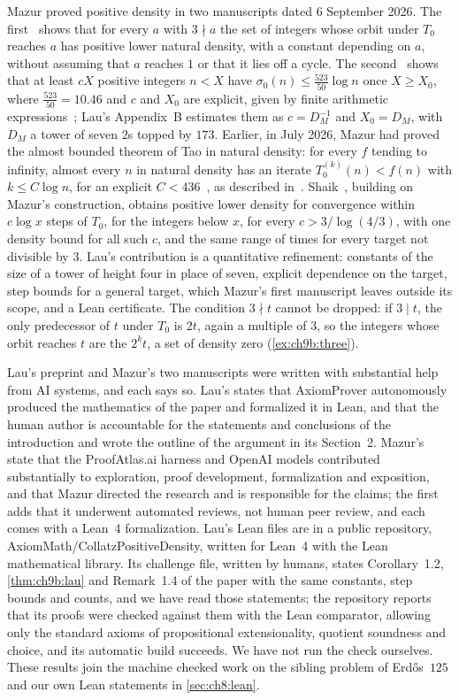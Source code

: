 Mazur proved positive density in two manuscripts dated 6 September 2026. The first~\cite[Theorem~1.1]{mazur2026pred} shows that for every $a$ with $3\nmid a$ the set of integers whose orbit under $T_0$ reaches $a$ has positive lower natural density, with a constant depending on $a$, without assuming that $a$ reaches $1$ or that it lies off a cycle. The second~\cite[Theorem~1.1]{mazur2026time} shows that at least $cX$ positive integers $n<X$ have $\sigma_0(n)\le\frac{523}{50}\log n$ once $X\ge X_0$, where $\frac{523}{50}=10.46$ and $c$ and $X_0$ are explicit, given by finite arithmetic expressions~\cite[eq.~(8.6)]{mazur2026time}; Lau's Appendix~B estimates them as $c=D_M^{-1}$ and $X_0=D_M$, with $D_M$ a tower of seven $2$s topped by $173$. Earlier, in July 2026, Mazur had proved the almost bounded theorem of Tao in natural density: for every $f$ tending to infinity, almost every $n$ in natural density has an iterate $T_0^{(k)}(n)<f(n)$ with $k\le C\log n$, for an explicit $C<436$~\cite{mazur2026natural}, as described in~\cite{mazur2026time}. Shaik~\cite{shaik2026}, building on Mazur's construction, obtains positive lower density for convergence within $c\log x$ steps of $T_0$, for the integers below $x$, for every $c>3/\log(4/3)$, with one density bound for all such $c$, and the same range of times for every target not divisible by $3$. Lau's contribution is a quantitative refinement: constants of the size of a tower of height four in place of seven, explicit dependence on the target, step bounds for a general target, which Mazur's first manuscript leaves outside its scope, and a Lean certificate. The condition $3\nmid t$ cannot be dropped: if $3\mid t$, the only predecessor of $t$ under $T_0$ is $2t$, again a multiple of $3$, so the integers whose orbit reaches $t$ are the $2^kt$, a set of density zero (\cref{ex:ch9b:three}).

Lau's preprint and Mazur's two manuscripts were written with substantial help from AI systems, and each says so. Lau's states that AxiomProver autonomously produced the mathematics of the paper and formalized it in Lean, and that the human author is accountable for the statements and conclusions of the introduction and wrote the outline of the argument in its Section~2. Mazur's state that the ProofAtlas.ai harness and OpenAI models contributed substantially to exploration, proof development, formalization and exposition, and that Mazur directed the research and is responsible for the claims; the first adds that it underwent automated reviews, not human peer review, and each comes with a Lean~4 formalization. Lau's Lean files are in a public repository, AxiomMath/CollatzPositiveDensity, written for Lean~4 with the Lean mathematical library. Its challenge file, written by humans, states Corollary~1.2, \cref{thm:ch9b:lau} and Remark~1.4 of the paper with the same constants, step bounds and counts, and we have read those statements; the repository reports that its proofs were checked against them with the Lean comparator, allowing only the standard axioms of propositional extensionality, quotient soundness and choice, and its automatic build succeeds. We have not run the check ourselves. These results join the machine checked work on the sibling problem of Erd\H{o}s~$125$ and our own Lean statements in \cref{sec:ch8:lean}.

